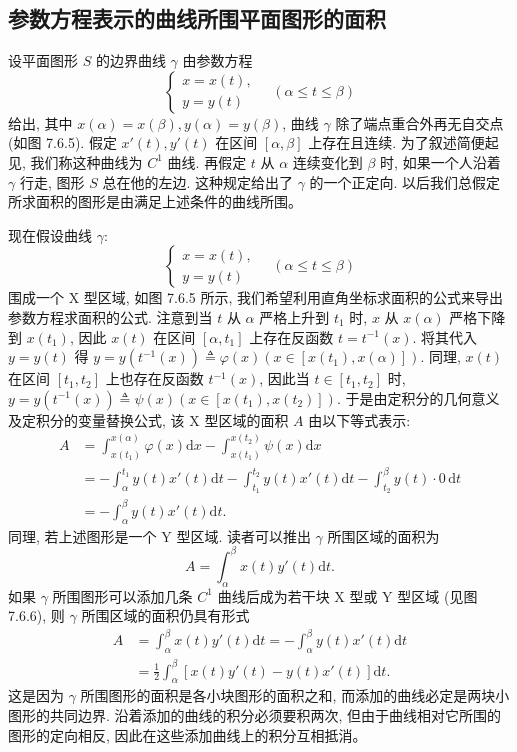 \documentclass[UTF8,12pt,a4paper,fontset=fandol]{ctexart}
\begin{document}
\subsection{参数方程表示的曲线所围平面图形的面积}

设平面图形 $S$ 的边界曲线 $\gamma$ 由参数方程
\[
  \begin{cases}
    x=x(t),\\
    y=y(t)
  \end{cases}
  \quad(\alpha\leq t\leq\beta)
\]
给出, 其中 $x(\alpha)=x(\beta),y(\alpha)=y(\beta)$, 曲线 $\gamma$ 除了端点重合外再无自交点 (如图 7.6.5). 假定 $x'(t),y'(t)$ 在区间 $[\alpha,\beta]$ 上存在且连续. 为了叙述简便起见, 我们称这种曲线为 $C^1$ 曲线. 再假定 $t$ 从 $\alpha$ 连续变化到 $\beta$ 时, 如果一个人沿着 $\gamma$ 行走, 图形 $S$ 总在他的左边. 这种规定给出了 $\gamma$ 的一个正定向. 以后我们总假定所求面积的图形是由满足上述条件的曲线所围。

现在假设曲线 $\gamma$:
\[
  \begin{cases}
    x=x(t),\\
    y=y(t)
  \end{cases}
  \quad(\alpha\leq t\leq\beta)
\]
围成一个 X 型区域, 如图 7.6.5 所示, 我们希望利用直角坐标求面积的公式来导出参数方程求面积的公式. 注意到当 $t$ 从 $\alpha$ 严格上升到 $t_1$ 时, $x$ 从 $x(\alpha)$ 严格下降到 $x(t_1)$, 因此 $x(t)$ 在区间 $[\alpha,t_1]$ 上存在反函数 $t=t^{-1}(x)$. 将其代入 $y=y(t)$ 得 $y=y(t^{-1}(x))\triangleq\varphi(x)(x\in[x(t_1),x(\alpha)])$. 同理, $x(t)$ 在区间 $[t_1,t_2]$ 上也存在反函数 $t^{-1}(x)$, 因此当 $t\in[t_1,t_2]$ 时, $y=y(t^{-1}(x))\triangleq\psi(x)(x\in[x(t_1),x(t_2)])$. 于是由定积分的几何意义及定积分的变量替换公式, 该 X 型区域的面积 $A$ 由以下等式表示:
\[
\begin{aligned}
  A&=\int_{x(t_1)}^{x(\alpha)}\varphi(x)\mathrm dx
  -\int_{x(t_1)}^{x(t_2)}\psi(x)\mathrm dx\\
  &=-\int_\alpha^{t_1}y(t)x'(t)\mathrm dt
  -\int_{t_1}^{t_2}y(t)x'(t)\mathrm dt
  -\int_{t_2}^{\beta}y(t)\cdot0\,\mathrm dt\\
  &=-\int_\alpha^\beta y(t)x'(t)\mathrm dt.
\end{aligned}
\]
同理, 若上述图形是一个 Y 型区域. 读者可以推出 $\gamma$ 所围区域的面积为
\[
  A=\int_\alpha^\beta x(t)y'(t)\mathrm dt.
\]
如果 $\gamma$ 所围图形可以添加几条 $C^1$ 曲线后成为若干块 X 型或 Y 型区域 (见图 7.6.6), 则 $\gamma$ 所围区域的面积仍具有形式
\begin{equation}
\begin{aligned}
  A&=\int_\alpha^\beta x(t)y'(t)\mathrm dt
  =-\int_\alpha^\beta y(t)x'(t)\mathrm dt\\
  &=\frac{1}{2}\int_\alpha^\beta [x(t)y'(t)-y(t)x'(t)]\mathrm dt.
\end{aligned}
\tag{7.6.4}
\end{equation}
这是因为 $\gamma$ 所围图形的面积是各小块图形的面积之和, 而添加的曲线必定是两块小图形的共同边界. 沿着添加的曲线的积分必须要积两次, 但由于曲线相对它所围的图形的定向相反, 因此在这些添加曲线上的积分互相抵消。
\end{document}
